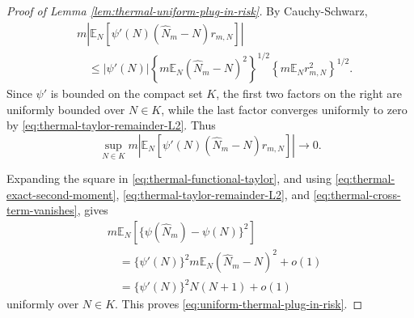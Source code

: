 \documentclass{article}
\theoremstyle{named}
\theoremstyle{named1}
\newcommand{\E}{\mathbb{E}}
\theoremstyle{plain}
\theoremstyle{remark}
\begin{document}
\begin{proof}[Proof of Lemma \ref{lem:thermal-uniform-plug-in-risk}]
By Cauchy-Schwarz,
\begin{align}
&
    m
    \left|
        \E_N
        \left[
            \psi'(N)
            (\widehat N_m-N)
            r_{m,N}
        \right]
    \right|
    \nonumber\\
&\quad\leq
    |\psi'(N)|
    \left\{
        m\E_N(\widehat N_m-N)^2
    \right\}^{1/2}
    \left\{
        m\E_Nr_{m,N}^2
    \right\}^{1/2}.
    \label{eq:thermal-cross-term-bound}
\end{align}
Since \(\psi'\) is bounded on the compact set \(K\), the first two
factors on the right are uniformly bounded over \(N\in K\), while the
last factor converges uniformly to zero by
\eqref{eq:thermal-taylor-remainder-L2}. Thus
\begin{equation}
    \sup_{N\in K}
    m
    \left|
        \E_N
        \left[
            \psi'(N)
            (\widehat N_m-N)
            r_{m,N}
        \right]
    \right|
    \rightarrow0.
    \label{eq:thermal-cross-term-vanishes}
\end{equation}

Expanding the square in \eqref{eq:thermal-functional-taylor}, and using
\eqref{eq:thermal-exact-second-moment},
\eqref{eq:thermal-taylor-remainder-L2}, and
\eqref{eq:thermal-cross-term-vanishes}, gives
\begin{align}
&
    m\E_N
    \left[
        \{\psi(\widehat N_m)-\psi(N)\}^2
    \right]
    \nonumber\\
&\quad=
    \{\psi'(N)\}^2
    m\E_N(\widehat N_m-N)^2
    +
    o(1)
    \nonumber\\
&\quad=
    \{\psi'(N)\}^2N(N+1)+o(1)
    \label{eq:thermal-plug-in-leading-term}
\end{align}
uniformly over \(N\in K\). This proves
\eqref{eq:uniform-thermal-plug-in-risk}.
\end{proof}
\end{document}
